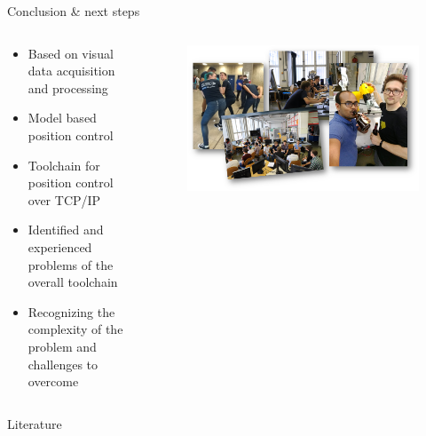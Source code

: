 \documentclass[
xcolor=dvipsnames,
aspectratio=169,
9pt,
]{beamer}
\begin{document}
\begin{frame}{Conclusion \& next steps}


	\begin{columns}
	\begin{column}{0.5\textwidth}
		\begin{itemize}
			\item Based on visual data acquisition and processing
			\item Model based position control
			\item Toolchain for position control over TCP/IP
		\end{itemize}
	\begin{itemize}
		\item Identified and experienced problems of the overall toolchain
		\item Recognizing the complexity of the problem and challenges to overcome
	\end{itemize}
	\end{column}
	\begin{column}{0.5\textwidth}
		\begin{center}
			\begin{figure}
				\includegraphics[width=1.1\textwidth]{img/FinalPictureCollage}
			\end{figure}
		\end{center}
	\end{column}
\end{columns}

\end{frame}


\begin{frame}{Literature}

%



\end{frame}
\end{document}
